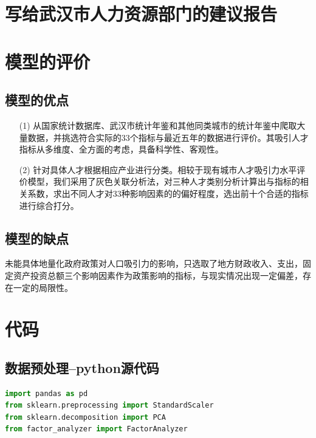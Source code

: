 \documentclass{whutmod}
\begin{document}
\begin{itemize}
	\section{写给武汉市人力资源部门的建议报告}
	
	\section{模型的评价}
	\subsection{模型的优点}
	\begin{itemize}
		\item [(1)] 从国家统计数据库、武汉市统计年鉴和其他同类城市的统计年鉴中爬取大量数据，并挑选符合实际的33个指标与最近五年的数据进行评价。其吸引人才指标从多维度、全方面的考虑，具备科学性、客观性。
		\item [(2)]针对具体人才根据相应产业进行分类。相较于现有城市人才吸引力水平评价模型，我们采用了灰色关联分析法，对三种人才类别分析计算出与指标的相关系数，求出不同人才对33种影响因素的的偏好程度，选出前十个合适的指标进行综合打分。
	\end{itemize}

	
	\subsection{模型的缺点}
    未能具体地量化政府政策对人口吸引力的影响，只选取了地方财政收入、支出，固定资产投资总额三个影响因素作为政策影响的指标，与现实情况出现一定偏差，存在一定的局限性。

    
    
	\newpage	%
	\nocite{*}		%

	
	\newpage
	\appendix %
\section{代码}
\subsection{数据预处理--python源代码}
\begin{lstlisting}[language=python]%这里修改语言
import pandas as pd
from sklearn.preprocessing import StandardScaler
from sklearn.decomposition import PCA
from factor_analyzer import FactorAnalyzer


\end{lstlisting}
\end{itemize}
\end{document}
